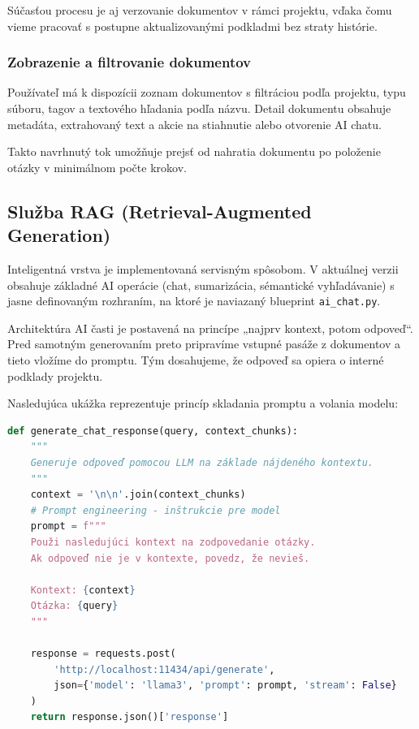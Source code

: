 \documentclass[12pt, a4paper]{article}
\begin{document}
\begin{titlepage}
Súčasťou procesu je aj verzovanie dokumentov v rámci projektu, vďaka čomu vieme pracovať s postupne aktualizovanými podkladmi bez straty histórie.

\subsubsection{Zobrazenie a filtrovanie dokumentov}
Používateľ má k dispozícii zoznam dokumentov s filtráciou podľa projektu, typu súboru, tagov a textového hľadania podľa názvu. Detail dokumentu obsahuje metadáta, extrahovaný text a akcie na stiahnutie alebo otvorenie AI chatu.

Takto navrhnutý tok umožňuje prejsť od nahratia dokumentu po položenie otázky v minimálnom počte krokov.

\subsection{Služba RAG (Retrieval-Augmented Generation)}
Inteligentná vrstva je implementovaná servisným spôsobom. V aktuálnej verzii obsahuje základné AI operácie (chat, sumarizácia, sémantické vyhľadávanie) s jasne definovaným rozhraním, na ktoré je naviazaný blueprint \texttt{ai\_chat.py}.

Architektúra AI časti je postavená na princípe „najprv kontext, potom odpoveď“. Pred samotným generovaním preto pripravíme vstupné pasáže z dokumentov a tieto vložíme do promptu. Tým dosahujeme, že odpoveď sa opiera o interné podklady projektu.

Nasledujúca ukážka reprezentuje princíp skladania promptu a volania modelu:

\begin{lstlisting}[language=Python, frame=single, basicstyle=\footnotesize]
def generate_chat_response(query, context_chunks):
    """
    Generuje odpoveď pomocou LLM na základe nájdeného kontextu.
    """
    context = '\n\n'.join(context_chunks)
    # Prompt engineering - inštrukcie pre model
    prompt = f"""
    Použi nasledujúci kontext na zodpovedanie otázky.
    Ak odpoveď nie je v kontexte, povedz, že nevieš.
    
    Kontext: {context}
    Otázka: {query}
    """
    
    response = requests.post(
        'http://localhost:11434/api/generate',
        json={'model': 'llama3', 'prompt': prompt, 'stream': False}
    )
    return response.json()['response']
\end{lstlisting}


\end{titlepage}
\end{document}
